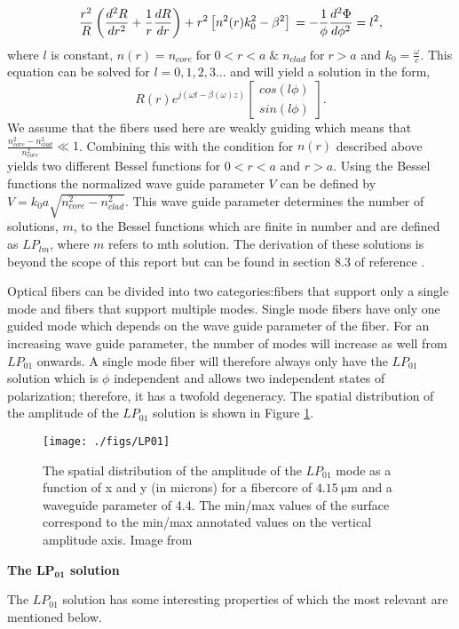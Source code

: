 \begin{equation}
\frac{r^2}{R}\left( \frac{d^2R}{dr^2} + \frac{1}{r} \frac{dR}{dr} \right) + r^2 \left[ n^2(r)k_0^2 -\beta^2 \right]  \\
= - \frac{1}{\phi} \frac{d^2\Phi}{d\phi^2} = l^2,
\end{equation}
where $l$ is constant, $n(r) = n_{core} \mathrm{\; for \;} 0 < r < a \; \& \; n_{clad} \mathrm{\;for\;} r >a$ and $k_0 = \frac{\omega}{c}$. 
This equation can be solved for $l = 0,1,2,3...$ and will yield a solution in the form, 
\begin{equation}
R(r)e^{j\left(\omega t - \beta ( \omega) z\right)} \left[ \begin{matrix}
cos \left( l \phi \right) \\
sin \left( l \phi \right) 
\end{matrix} \right].\end{equation} We assume that the fibers used here are weakly guiding which means that $\frac{n_{core}^2 -n_{clad}^2}{n_{core}^2} \ll 1$. Combining this with the condition for $n(r)$ described above yields two different Bessel functions for $0<r<a$ and $r>a$. Using the Bessel functions the normalized wave guide parameter $V$ can be defined by $ V = k_0 a \sqrt{n_{core}^2 - n_{clad}^2}$. 
This wave guide parameter determines the number of solutions, $m$, to the Bessel functions which are finite in number and are defined as $LP_{lm}$, where $m$ refers to mth solution. The derivation of these solutions is beyond the scope of this report but can be found in section 8.3 of reference \cite{ghatak1998introduction}.

Optical fibers can be divided into two categories:fibers that support only a single mode and fibers that support multiple modes. Single mode fibers have only one guided mode which depends on the wave guide parameter of the fiber. For an increasing wave guide parameter, the number of modes will increase as well from $LP_{01}$ onwards. A single mode fiber will therefore always only have the $LP_{01}$ solution which is $\phi$ independent and allows two independent states of polarization; therefore, it has a twofold degeneracy. The spatial distribution of the amplitude of the $LP_{01}$ solution is shown in Figure \ref{fig:LP01}.

\begin{figure}[h!]\centering
\texttt{[image: ./figs/LP01]}
\caption{The spatial distribution of the amplitude of the $LP_{01}$ mode as a function of x and y (in microns) for a fibercore of $4.15 \: \mathrm{\mu m}$ and a waveguide parameter of 4.4. The min/max values of the surface correspond to the min/max annotated values on the vertical amplitude axis. Image from \cite{thevenaz2011advanced}}
\label{fig:LP01}
\end{figure}
{\raggedright\color{color1}\textbf{The $\mathbf{LP_{01}}$ solution}}
The $LP_{01}$ solution has some interesting properties of which the most relevant are mentioned below. 

